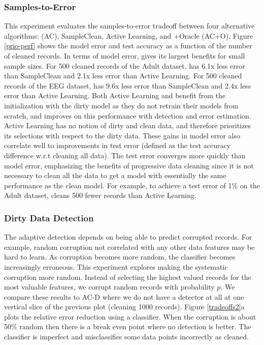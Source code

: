\subsubsection{Samples-to-Error}
This experiment evaluates the samples-to-error tradeoff between four alternative algorithms: \sys (AC), SampleClean, Active Learning, and \sys+Oracle (AC+O).
Figure \ref{prio-perf} shows the model error and test accuracy as a function of the number of cleaned records.
In terms of model error, \sys gives its largest benefits for small sample sizes.
For 500 cleaned records of the Adult dataset, \sys has 6.1x less error than SampleClean and 2.1x less error than Active Learning.
For 500 cleaned records of the EEG dataset, \sys has 9.6x less error than SampleClean and 2.4x less error than Active Learning.
Both Active Learning and \sys benefit from the initialization with the dirty model as they do not retrain their models from scratch, and \sys improves on this performance with detection and error estimation.
Active Learning has no notion of dirty and clean data, and therefore prioritizes its selections with respect to the dirty data.
These gains in model error also correlate well to improvements in test error (defined as the test accuracy difference w.r.t cleaning all data).
The test error converges more quickly than model error, emphasizing the benefits of progressive data cleaning since it is not necessary to clean all the data to get a model with essentially the same performance as the clean model.
For example, to achieve a test error of 1\% on the Adult dataset, \sys cleans 500 fewer records than Active Learning.
\fi

\subsubsection{Dirty Data Detection}
The adaptive detection depends on being able to predict corrupted records.
For example, random corruption not correlated with any other data features may be hard to learn.
As corruption becomes more random, the classifier becomes increasingly erroneous.
This experiment explores making the systematic corruption more random.
Instead of selecting the highest valued records for the most valuable features, we corrupt random records with probability $p$. 
We compare these results to AC-D where we do not have a detector at all at one vertical slice of the previous plot (cleaning 1000 records).
Figure \ref{tradeoffs2}a plots the relative error reduction using a classifier.
When the corruption is about 50\% random then there is a break even point where no detection is better.
The classifier is imperfect and misclassifies some data points incorrectly as cleaned.

